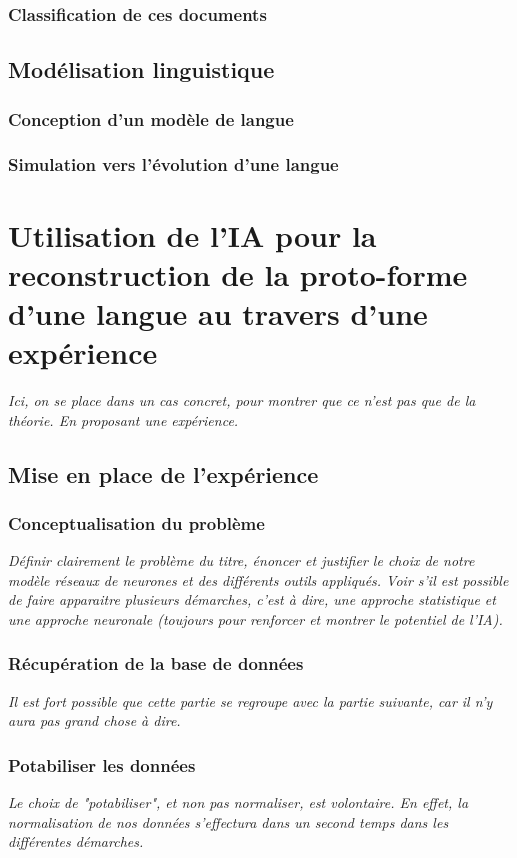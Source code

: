 \documentclass[12pt, letterpaper]{report}
\begin{document}
\subsection{Classification de ces documents}
\section{Modélisation linguistique}
\subsection{Conception d'un modèle de langue}
\subsection{Simulation vers l'évolution d'une langue}

\chapter{Utilisation de l'IA pour la reconstruction de la proto-forme d'une langue au travers d'une expérience}
\textit{Ici, on se place dans un cas concret, pour montrer que ce n'est pas que de la théorie. En proposant une expérience.}
\section{Mise en place de l'expérience}
\subsection{Conceptualisation du problème}
\textit{Définir clairement le problème du titre, énoncer et justifier le choix de notre modèle réseaux de neurones et des différents outils appliqués. Voir s'il est possible de faire apparaitre plusieurs démarches, c'est à dire, une approche statistique et une approche neuronale (toujours pour renforcer et montrer le potentiel de l'IA).}
\subsection{Récupération de la base de données}
\textit{Il est fort possible que cette partie se regroupe avec la partie suivante, car il n'y aura pas grand chose à dire.}
\subsection{Potabiliser les données}
\textit{Le choix de "potabiliser", et non pas normaliser, est volontaire. En effet, la normalisation de nos données s'effectura dans un second temps dans les différentes démarches.}
\end{document}
